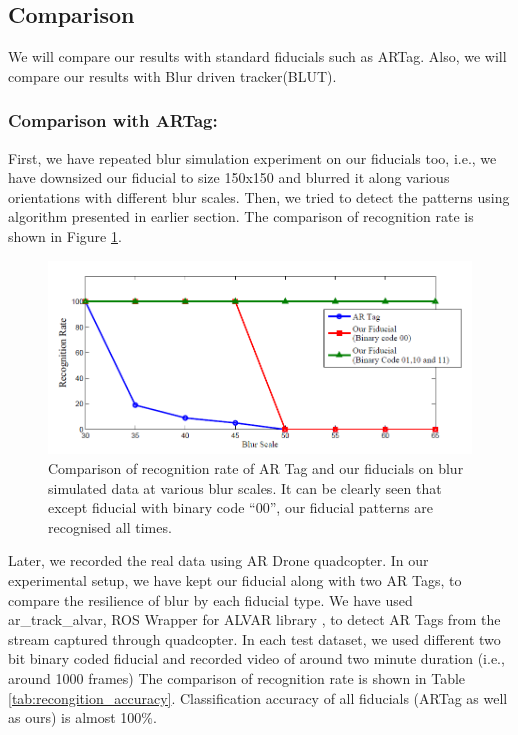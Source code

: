 \documentclass[runningheads]{llncs}
\begin{document}
\subsection{Comparison}
We will compare our results with standard fiducials such as ARTag. Also, we will
compare our results with Blur driven tracker(BLUT)\cite{Wu:2011}.
\subsubsection{Comparison with ARTag:}
First, we have repeated blur simulation experiment on our fiducials too, i.e.,
we have downsized our fiducial to size 150x150 and blurred it along various
orientations with different blur scales. Then, we tried to detect the patterns
using algorithm presented in earlier section. The comparison of recognition
rate is shown in Figure \ref{fig:recognition_rate}.

\begin{figure}[h!]
\centering
\includegraphics[width=\linewidth]{recognition_rate.png}
\caption{Comparison of recognition rate of AR Tag and our fiducials on
blur simulated data at various blur scales. It can be clearly seen that except
fiducial with binary code ``00'', our fiducial patterns are
recognised all times.}
\label{fig:recognition_rate}
\end{figure}

Later, we recorded the real data using AR Drone quadcopter. In our experimental
setup, we have kept our fiducial along with two AR Tags, to compare the
resilience of blur by each fiducial type. We have used ar\_track\_alvar, ROS
Wrapper for ALVAR library \cite{ros_alvar}, to detect AR Tags from the stream
captured through quadcopter. In each test dataset, we used different two bit
binary coded fiducial and recorded video of around two minute duration (i.e.,
around 1000 frames) The comparison of recognition rate is shown in Table
\ref{tab:recongition_accuracy}. Classification accuracy of all fiducials (ARTag
as well as ours) is almost 100\%.
\end{document}
